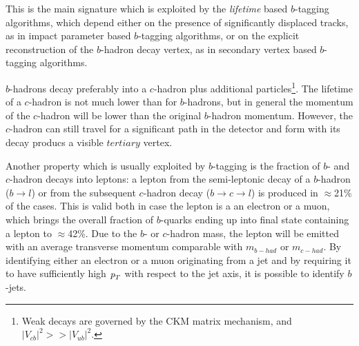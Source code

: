 This is the main signature which is exploited by the \emph{lifetime} based $b$-tagging algorithms, which depend either on the presence of significantly displaced tracks, as in impact parameter based $b$-tagging algorithms, or on the explicit reconstruction of the $b$-hadron decay vertex, as in secondary vertex based $b$-tagging algorithms.


$b$-hadrons decay preferably into a $c$-hadron plus additional particles\footnote{Weak decays are governed by the CKM matrix mechanism, and $|V_{cb}|^2 >> |V_{ub}|^2$.}. The lifetime of a $c$-hadron is not much lower than for $b$-hadrons, but in general the momentum of the $c$-hadron will be lower than the original $b$-hadron momentum. However, the $c$-hadron can still travel for a significant path in the detector and form with its decay producs a visible $tertiary$ vertex. 

Another property which is usually exploited by $b$-tagging is the fraction of $b$- and $c$-hadron decays into leptons: a lepton from the semi-leptonic decay of a $b$-hadron ($b \rightarrow l$) or from the subsequent $c$-hadron decay ($b \rightarrow c \rightarrow l$) is produced in $\approx$21\% of the cases. This is valid both in case the lepton is a an electron or a muon, which brings the overall fraction of $b$-quarks ending up into final state containing  a lepton to $\approx$42\%. Due to the $b$- or $c$-hadron mass, the lepton will be emitted with an average transverse momentum comparable with $m_{b-had}$ or $m_{c-had}$. By identifying either an electron or a muon originating from a jet and by requiring it to have sufficiently high ${\emph{p}_{T}}$ with respect to the jet axis, it is possible to identify $b$-jets.



